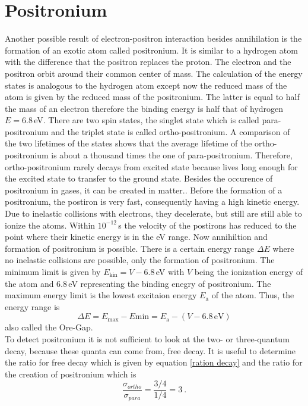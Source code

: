 \section{Positronium}
Another possible result of electron-positron interaction besides annihilation is the formation of an exotic atom called positronium. It is similar to a hydrogen atom with the difference that the positron replaces the proton. The electron and the positron orbit around their common center of mass. The calculation of the energy states is analogous to the hydrogen atom except now the reduced mass of the atom is given by the reduced mass of the positronium. The latter is equal to half the mass of an electron therefore the binding energy is half that of hydrogen $E=6.8\,$eV. There are two spin states, the singlet state which is called para-positronium and the triplet state is called ortho-positronium. A comparison of the two lifetimes of the states shows that the average lifetime of the ortho-positronium is about a thousand times the one of para-positronium. Therefore, ortho-positronium rarely decays from excited state because lives long enough for the excited state to transfer to the ground state.
Besides the occurence of positronium in gases, it can be created in matter.. Before the formation of a positronium, the postiron is very fast, consequently having a high kinetic energy. Due to inelastic collisions with electrons, they decelerate, but still are still able to ionize the atoms. Within $10^{-12}\,$s the velocity of the postirons has reduced to the point where their kinetic energy is in the eV range. Now annihiltion and formation of positronium is possible. There is a certain energy range $\Delta E$ where no inelastic collisions are possible, only the formation of positronium. The minimum limit is given by $E_\text{kin}=V-6.8\,$eV with $V$ being the ionization energy of the atom and $6.8\,$eV representing the binding enegry of positronium. The maximum energy limit is the lowest excitaion energy $E_\text{a}$ of the atom. Thus, the energy range is $$\Delta E=E_\text{max}-E\text{min}=E_\text{a}-(V-6.8\,\text{eV})$$ also called the Ore-Gap.\\
To detect positronium it is not sufficient to look at the two- or three-quantum decay, because these quanta can come from, free decay. It is useful to determine the ratio for free decay which is given by equation \ref{ration decay} and the ratio for the creation of positronium which is 
\begin{equation}
    \frac{\sigma_{ortho}}{\sigma_{para}}=\frac{3/4}{1/4}=3 ~.
    \label{ratio formation}
\end{equation}
